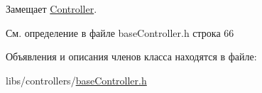 Замещает \hyperlink{class_controller_a4cc69a630011f49efb0c221d617af633}{Controller}.



См. определение в файле base\-Controller.\-h строка 66



Объявления и описания членов класса находятся в файле\-:\begin{DoxyCompactItemize}
\item 
libs/controllers/\hyperlink{base_controller_8h}{base\-Controller.\-h}\end{DoxyCompactItemize}

